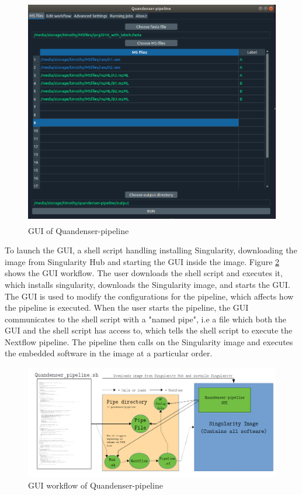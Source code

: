 \begin{figure}[H]
  \begin{center}
  \includegraphics[height=10cm]{pictures/gui.png}
  \caption{GUI of Quandenser-pipeline}
  \label{fig:GUI}
  \end{center}
\end{figure}

To launch the GUI, a shell script handling installing Singularity, downloading the image from Singularity Hub and starting the GUI inside the image. Figure \ref{fig:GUI_workflow} shows the GUI workflow. The user downloads the shell script and executes it, which installs singularity, downloads the Singularity image, and starts the GUI. The GUI is used to modify the configurations for the pipeline, which affects how the pipeline is executed. When the user starts the pipeline, the GUI communicates to the shell script with a "named pipe", i.e a file which both the GUI and the shell script has access to, which tells the shell script to execute the Nextflow pipeline. The pipeline then calls on the Singularity image and executes the embedded software in the image at a particular order.

\begin{figure}[H]
  \includegraphics[width=\linewidth]{pictures/GUI_workflow.png}
  \caption{GUI workflow of Quandenser-pipeline}
  \label{fig:GUI_workflow}
\end{figure}

